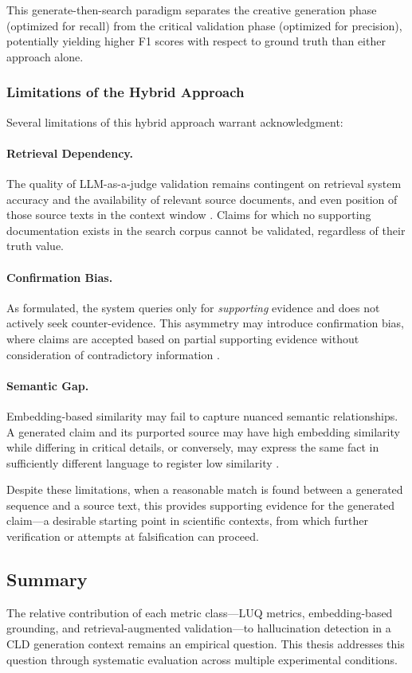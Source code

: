 This generate-then-search paradigm separates the creative generation phase (optimized for recall) from the critical validation phase (optimized for precision), potentially yielding higher F1 scores with respect to ground truth than either approach alone.

\subsubsection{Limitations of the Hybrid Approach}

Several limitations of this hybrid approach warrant acknowledgment:

\paragraph{Retrieval Dependency.} The quality of LLM-as-a-judge validation remains contingent on retrieval system accuracy and the availability of relevant source documents, and even position of those source texts in the context window \citep{liu2023lostmiddle}. Claims for which no supporting documentation exists in the search corpus cannot be validated, regardless of their truth value.

\paragraph{Confirmation Bias.} As formulated, the system queries only for \textit{supporting} evidence and does not actively seek counter-evidence. This asymmetry may introduce confirmation bias, where claims are accepted based on partial supporting evidence without consideration of contradictory information \citep{nickerson1998confirmationbias}.

\paragraph{Semantic Gap.} Embedding-based similarity may fail to capture nuanced semantic relationships. A generated claim and its purported source may have high embedding similarity while differing in critical details, or conversely, may express the same fact in sufficiently different language to register low similarity \citep{wang2022sncsecontrastivelearningunsupervised}.

\noindent Despite these limitations, when a reasonable match is found between a generated sequence and a source text, this provides supporting evidence for the generated claim---a desirable starting point in scientific contexts, from which further verification or attempts at falsification can proceed. 

\subsection{Summary}

The relative contribution of each metric class---LUQ metrics, embedding-based grounding, and retrieval-augmented validation---to hallucination detection in a CLD generation context remains an empirical question. This thesis addresses this question through systematic evaluation across multiple experimental conditions.
